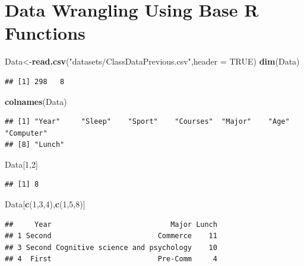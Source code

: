 \documentclass[
  openany]{book}
\newenvironment{Shaded}{\begin{snugshade}}{\end{snugshade}}
\newcommand{\AttributeTok}[1]{\textcolor[rgb]{0.13,0.29,0.53}{#1}}
\newcommand{\ConstantTok}[1]{\textcolor[rgb]{0.56,0.35,0.01}{#1}}
\newcommand{\DecValTok}[1]{\textcolor[rgb]{0.00,0.00,0.81}{#1}}
\newcommand{\FunctionTok}[1]{\textcolor[rgb]{0.13,0.29,0.53}{\textbf{#1}}}
\newcommand{\NormalTok}[1]{#1}
\newcommand{\OtherTok}[1]{\textcolor[rgb]{0.56,0.35,0.01}{#1}}
\newcommand{\StringTok}[1]{\textcolor[rgb]{0.31,0.60,0.02}{#1}}
\begin{document}
\section{Data Wrangling Using Base R Functions}\label{data-wrangling-using-base-r-functions}

\begin{Shaded}
\begin{Highlighting}[]
\NormalTok{Data}\OtherTok{\textless{}{-}}\FunctionTok{read.csv}\NormalTok{(}\StringTok{"datasets/ClassDataPrevious.csv"}\NormalTok{,}\AttributeTok{header =} \ConstantTok{TRUE}\NormalTok{)}
\FunctionTok{dim}\NormalTok{(Data)}
\end{Highlighting}
\end{Shaded}

\begin{verbatim}
## [1] 298   8
\end{verbatim}

\begin{Shaded}
\begin{Highlighting}[]
\FunctionTok{colnames}\NormalTok{(Data)}
\end{Highlighting}
\end{Shaded}

\begin{verbatim}
## [1] "Year"     "Sleep"    "Sport"    "Courses"  "Major"    "Age"      "Computer"
## [8] "Lunch"
\end{verbatim}

\begin{Shaded}
\begin{Highlighting}[]
\NormalTok{Data[}\DecValTok{1}\NormalTok{,}\DecValTok{2}\NormalTok{]}
\end{Highlighting}
\end{Shaded}

\begin{verbatim}
## [1] 8
\end{verbatim}

\begin{Shaded}
\begin{Highlighting}[]
\NormalTok{Data[}\FunctionTok{c}\NormalTok{(}\DecValTok{1}\NormalTok{,}\DecValTok{3}\NormalTok{,}\DecValTok{4}\NormalTok{),}\FunctionTok{c}\NormalTok{(}\DecValTok{1}\NormalTok{,}\DecValTok{5}\NormalTok{,}\DecValTok{8}\NormalTok{)]}
\end{Highlighting}
\end{Shaded}

\begin{verbatim}
##     Year                            Major Lunch
## 1 Second                         Commerce    11
## 3 Second Cognitive science and psychology    10
## 4  First                         Pre-Comm     4
\end{verbatim}
\end{document}
